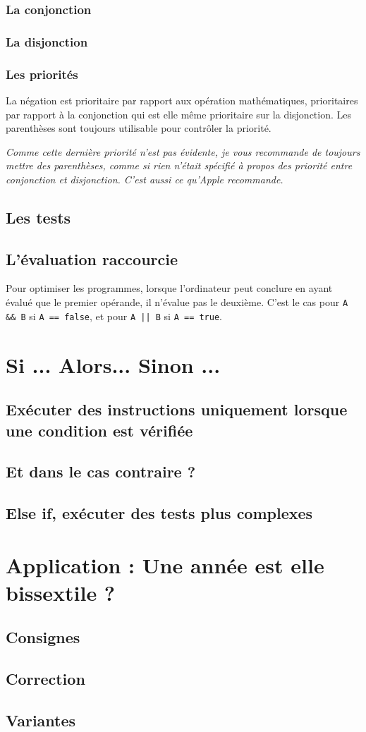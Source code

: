 \subsubsection{La conjonction}
\subsubsection{La disjonction}
\subsubsection{Les priorités}
La négation est prioritaire par rapport aux opération mathématiques, prioritaires par rapport à la conjonction qui est elle même prioritaire sur la disjonction. Les parenthèses sont toujours utilisable pour contrôler la priorité.

\emph{Comme cette dernière priorité n'est pas évidente, je vous recommande de toujours mettre des parenthèses, comme si rien n'était spécifié à propos des priorité entre conjonction et disjonction. C'est aussi ce qu'\emph{Apple} recommande.}
\subsection{Les tests}
\subsection{L'évaluation raccourcie}
Pour optimiser les programmes, lorsque l'ordinateur peut conclure en ayant évalué que le premier opérande, il n'évalue pas le deuxième. C'est le cas pour \texttt{A && B} si \texttt{A == false},
et pour \texttt{A || B} si \texttt{A == true}.
\section{Si ... Alors... Sinon ...}
\subsection{Exécuter des instructions uniquement lorsque une condition est vérifiée}

\subsection{Et dans le cas contraire ?}
\subsection{Else if, exécuter des tests plus complexes}
\section{Application : Une année est elle bissextile ?}
\subsection{Consignes}
\subsection{Correction}
\subsection{Variantes}
